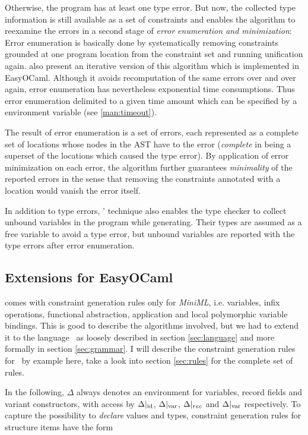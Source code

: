 Otherwise, the program has at least one type error. But now, the 
collected type information is still available as a set of constraints 
and enables the algorithm to reexamine the errors in a second stage of 
\emph{error enumeration and minimization}: Error enumeration is 
basically done by systematically removing constraints grounded at one 
program location from the constraint set and running unification again.
\citet{haackwells04} also present an iterative version of this algorithm which
is implemented in EasyOCaml. Although it avoids recomputation of the same
errors over and over again, error enumeration has nevertheless exponential time
consumptions. Thus error enumeration delimited to a given time amount which can
be specified by a environment variable (see \ref{man:timeout}).

The result of error enumeration is a set of errors, each represented as a
complete set of locations whose nodes in the AST have to the error
(\emph{complete} in being a superset of the locations which caused the type
error). By application of error minimization on each error, the algorithm
further guarantees \emph{minimality} of the reported errors in the sense that
removing the constraints annotated with a location would vanish the error
itself.

In addition to type errors, \citeauthor{haackwells04}' technique also enables the 
type checker to collect unbound variables in the program while 
generating. Their types are assumed as a free variable to avoid a type 
error, but unbound variables are reported with the type errors after 
error enumeration.


\subsection{Extensions for EasyOCaml}
\label{sec:extending}

\citet{haackwells04} comes with constraint generation rules only for
\textsl{MiniML}, i.e. variables, infix operations, functional abstraction,
application and local polymorphic variable bindings.
This is good to describe the algorithms involved, but we had to extend it to
the language \camlm\ as loosely described in section \ref{sec:language} and more
formally in section \ref{sec:grammar}. I will describe the constraint
generation rules for \easyocaml\ by example here, take a look into section
\ref{sec:rules} for the complete set of rules.

In the following, $\Delta$ always denotes an environment for variables, record
fields and variant constructors, with access by $\Delta|_{\text{id}}$,
$\Delta|_{\text{var}}$, $\Delta|_{rec}$ and $\Delta|_{\text{var}}$ respectively.
To capture the possibility to \emph{declare} values and types, constraint
generation rules for structure items have the form


